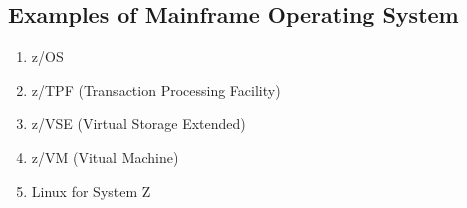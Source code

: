 \documentclass{article}
\begin{document}
       \subsection{Examples of Mainframe Operating System}
       \begin{enumerate}
           \item z/OS
           \item z/TPF (Transaction Processing Facility)
           \item z/VSE (Virtual Storage Extended)
           \item z/VM (Vitual Machine)
           \item Linux for System Z
       \end{enumerate}

    
\end{document}
